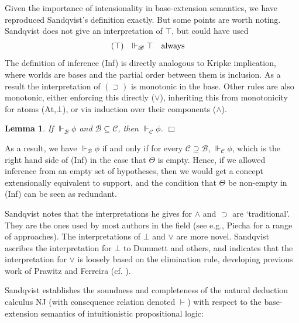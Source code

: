\documentclass{sn-jnl}
\newcommand{\At}{\text{At}}
\newcommand{\base}[1]{\mathscr{#1}}
\newcommand{\support}[2]{\Vdash_{\base{#1}}#2}
\newtheorem{lemma}[theorem]{Lemma}
\newcommand{\fillBox}{\hfill$\Box$}
\begin{document}
Given the importance of intensionality in base-extension semantics, we have reproduced Sandqvist's definition exactly. But some points are worth noting. Sandqvist does not give an interpretation of 
$\top$, but could have used
\[
\begin{array}{l@{\quad}r@{\quad}c@{\quad}l}
    (\top) & \support{B}{\top} & \mbox{always} & 
\end{array}
\]
The definition of inference (Inf) is directly analogous to Kripke implication, where worlds are bases and the partial order between them is inclusion. As a result the interpretation of $(\supset)$ is monotonic in the base. Other rules are also monotonic, either enforcing this directly ($\vee$), inheriting this from monotonicity for atoms ($\At$,$\bot$), or via induction over their components ($\wedge$). 

\smallskip 

\begin{lemma}
    If $\support{B}{\phi}$ and $\base{B}\subseteq\base{C}$, then 
    $\support{C}{\phi}$. \fillBox
\end{lemma}

\smallskip 

As a result, we have $\support{B}{\phi}$ if and only if for every $\base{C}\supseteq \base{B}$, $\support{C}{\phi}$, which is the right hand side of (Inf) in the case that $\Theta$ is empty. Hence, if we allowed inference from an empty set of hypotheses, then we would get a concept extensionally equivalent to support, and the condition that $\Theta$ be non-empty in (Inf) can be seen as redundant. 

Sandqvist notes that the interpretations he gives for $\wedge$ and 
$\supset$ are `traditional'.  They are the ones used by most 
authors in the field (see {e.g.,} Piecha \cite{Piecha2016completeness} 
for a range of approaches). The interpretations of $\bot$ and $\vee$ are more novel. Sandqvist ascribes the interpretation for $\bot$ to Dummett \cite{Dummett1991} and others, and indicates that the interpretation for $\vee$ is loosely based on the elimination rule, developing previous work of Prawitz \cite{Prawitz2005} and Ferreira \cite{Ferreira2006} (cf. \cite{Prawitz1971ideas,Prawitz2006meaning}). 

Sandqvist \cite{Sandqvist2015base} establishes the soundness and completeness 
of the natural deduction calculus NJ (with 
consequence relation denoted $\vdash$) with respect to the base-extension semantics of intuitionistic propositional logic: 
\end{document}
